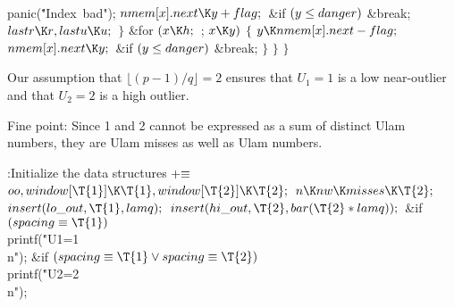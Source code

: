 \\{panic}(\.{"Index\ bad"});\2\2\6
${}\\{nmem}[\|x].\\{next}\K\|y+\\{flag};{}$\6
\&{if} ${}(\|y\Z\\{danger}){}$\1\5
\&{break};\2\6
${}\\{lastr}\K\|r,\39\\{lastu}\K\|u;{}$\6
\4${}\}{}$\2\6
\&{for} ${}(\|x\K\|h;{}$  ; ${}\|x\K\|y){}$\5
${}\{{}$\1\6
${}\|y\K\\{nmem}[\|x].\\{next}-\\{flag};{}$\6
${}\\{nmem}[\|x].\\{next}\K\|y;{}$\6
\&{if} ${}(\|y\Z\\{danger}){}$\1\5
\&{break};\2\6
\4${}\}{}$\2\6
\4${}\}{}$\2\6
\4${}\}{}$\2\par
\fi

Our assumption that $\lfloor(p-1)/q\rfloor=2$ ensures that
$U_1=1$ is a low near-outlier and that
$U_2=2$ is a high outlier.

Fine point: Since 1 and 2 cannot be expressed as a sum of distinct Ulam
numbers,
they are Ulam misses as well as Ulam numbers.

\Y\B\4:Initialize the data structures\X${}\mathrel+\equiv{}$\6
$\\{oo},\39\\{window}[\T{1}]\K\T{1},\39\\{window}[\T{2}]\K\T{2};{}$\6
${}\|n\K\\{nw}\K\\{misses}\K\T{2};{}$\6
${}\\{insert}(\\{lo\_out},\39\T{1},\39\\{lamq});{}$\6
${}\\{insert}(\\{hi\_out},\39\T{2},\39\\{bar}(\T{2}*\\{lamq}));{}$\6
\&{if} ${}(\\{spacing}\E\T{1}){}$\1\5
\\{printf}(\.{"U1=1\\n"});\2\6
\&{if} ${}(\\{spacing}\E\T{1}\V\\{spacing}\E\T{2}){}$\1\5
\\{printf}(\.{"U2=2\\n"});\2\par
\fi

